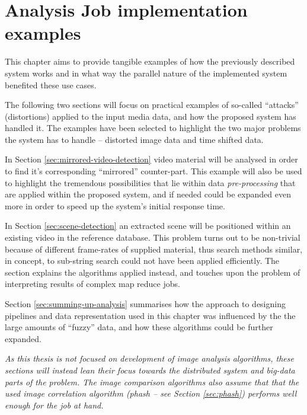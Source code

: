 \chapter{Analysis Job implementation examples}
\label{chap:analysis-examples}

This chapter aims to provide tangible examples of how the previously described system works and in what way the parallel nature of the implemented system benefited these use cases.

The following two sections will focus on practical examples of so-called ``attacks'' (distortions) applied to the input media data, and how the proposed system has handled it. The examples have been selected to highlight the two major problems the system has to handle -- distorted image data and time shifted data.

In Section \ref{sec:mirrored-video-detection} video material will be analysed in order to find it's corresponding ``mirrored'' counter-part. This example will also be used to highlight the tremendous possibilities that lie within data \textit{pre-processing} that are applied within the proposed system, and if needed could be expanded even more in order to speed up the system's initial response time.

In Section \ref{sec:scene-detection} an extracted scene will be positioned within an existing video in the reference database. This problem turns out to be non-trivial because of different frame-rates of supplied material, thus search methods similar, in concept, to sub-string search could not have been applied efficiently. The section explains the algorithms applied instead, and touches upon the problem of interpreting results of complex map reduce jobs.

Section \ref{sec:summing-up-analysis} summarises how the approach to designing pipelines and data representation used in this chapter was influenced by the the large amounts of ``fuzzy'' data, and how these algorithms could be further expanded.

\textit{As this thesis is not focused on development of image analysis algorithms, these sections will instead lean their focus towards the distributed system and big-data parts of the problem. The image comparison algorithms also assume that that the used image correlation algorithm (\textit{phash} -- see Section \ref{sec:phash}) performs well enough for the job at hand. }

